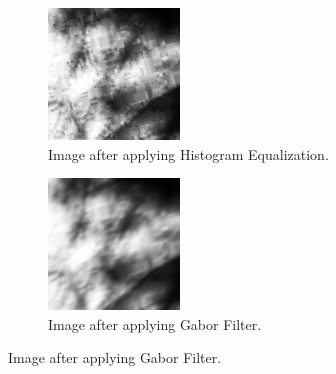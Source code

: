 \begin{enumerate}
    \begin{figure}[!ht]
        \centering
        \begin{subfigure}[t]{0.48\columnwidth}
            \includegraphics[width=\textwidth]{./images/preprocessing/rectified_image_equalized.png}
            \caption{Image after applying Histogram Equalization.}
            \label{fig:rectified_image_equalized}
        \end{subfigure}
        \hfill
        \begin{subfigure}[t]{0.48\columnwidth}
            \includegraphics[width=\textwidth]{./images/preprocessing/gabor_filtered_image.png}
            \caption{Image after applying Gabor Filter.}
            \label{fig:gabor_filtered_image}
        \end{subfigure}
    \end{figure}


\end{enumerate}
